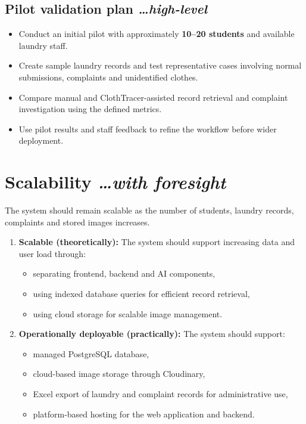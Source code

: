 \documentclass[11pt,a4paper]{article}
\newcommand{\BvrHint}[1]{%
  {\normalfont\normalsize\itshape\hfill #1}}
\begin{document}
\subsection{Pilot validation plan %
\BvrHint{\ldots high-level}}

\begin{itemize}[leftmargin=0.7cm]
    \item Conduct an initial pilot with approximately \textbf{10--20 students} and available laundry staff.
    
    \item Create sample laundry records and test representative cases involving normal submissions, complaints and unidentified clothes.
    
    \item Compare manual and ClothTracer-assisted record retrieval and complaint investigation using the defined metrics.
    
    \item Use pilot results and staff feedback to refine the workflow before wider deployment.
\end{itemize}
\section{Scalability %
\BvrHint{\ldots with foresight}}

The system should remain scalable as the number of students, laundry records, complaints and stored images increases.

\begin{enumerate}[leftmargin=0.7cm]

    \item \textbf{Scalable (theoretically):} The system should support increasing data and user load through:
    \begin{itemize}[leftmargin=0.7cm]
        \item separating frontend, backend and AI components,
        \item using indexed database queries for efficient record retrieval,
        \item using cloud storage for scalable image management.
    \end{itemize}

    \item \textbf{Operationally deployable (practically):} The system should support:
    \begin{itemize}[leftmargin=0.7cm]
        \item managed PostgreSQL database,
        \item cloud-based image storage through Cloudinary,
        \item Excel export of laundry and complaint records for administrative use,
        \item platform-based hosting for the web application and backend.
    \end{itemize}

\end{enumerate}
\end{document}
